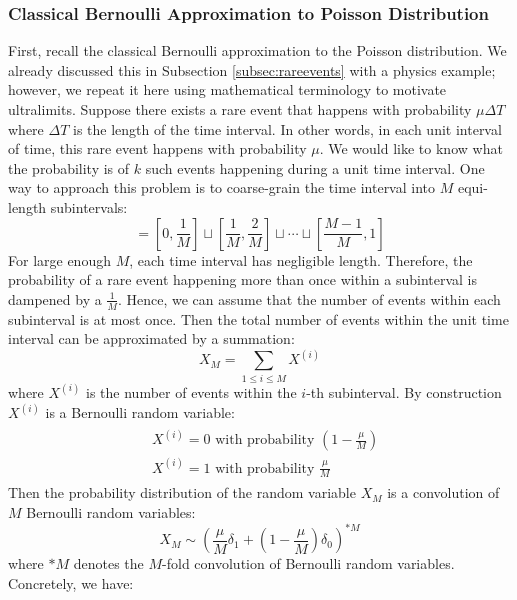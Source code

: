 \documentclass[a4paper,11pt]{article}
\theoremstyle{definition}
\numberwithin{equation}{section}
\begin{document}
\subsubsection{Classical Bernoulli Approximation to Poisson Distribution}\label{subsubsection:bernoulli}

First, recall the classical Bernoulli approximation to the Poisson distribution. We already discussed this in Subsection \ref{subsec:rareevents} with a physics example; however, we repeat it here using mathematical terminology to motivate ultralimits. Suppose there exists a rare event that happens with probability $\mu\Delta T$ where $\Delta T$ is the length of the time interval. In other words, in each unit interval of time, this rare event happens with probability $\mu$. We would like to know what the probability is of $k$ such events happening during a unit time interval. One way to approach this problem is to coarse-grain the time interval into $M$ equi-length subintervals:
\begin{equation}
    [0,1] = [0,\frac{1}{M}]\sqcup[\frac{1}{M}, \frac{2}{M}]\sqcup\cdots\sqcup[\frac{M-1}{M},1]
\end{equation}
For large enough $M$, each time interval has negligible length. Therefore, the probability of a rare event happening more than once within a subinterval is dampened by a $\frac{1}{M}$. Hence, we can assume that the number of events within each subinterval is at most once. Then the total number of events within the unit time interval can be approximated by a summation:
\begin{equation}
    X_M = \sum_{1\leq i\leq M}X^{(i)}
\end{equation}
where $X^{(i)}$ is the number of events within the $i$-th subinterval. By construction $X^{(i)}$ is a Bernoulli random variable:
\begin{align}
    \begin{split}
        &X^{(i)} = 0 \text{ with probability }(1 - \frac{\mu}{M})
        \\
        &X^{(i)} = 1 \text{ with probability }\frac{\mu}{M}
    \end{split}
\end{align}
Then the probability distribution of the random variable $X_M$ is a convolution of $M$ Bernoulli random variables:
\begin{equation}
    X_M\sim (\frac{\mu}{M}\delta_1 + (1 - \frac{\mu}{M})\delta_0)^{* M}
\end{equation}
where $*M$ denotes the $M$-fold convolution of Bernoulli random variables. Concretely, we have:
\end{document}
